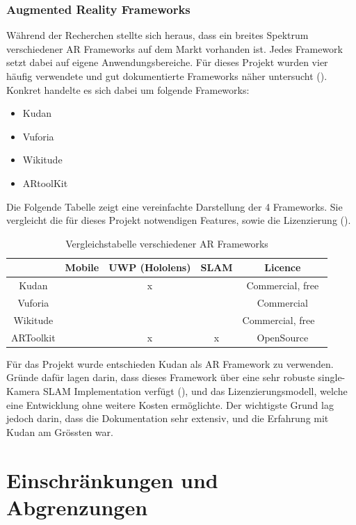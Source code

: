 \documentclass[a4paper]{scrreprt}
\begin{document}
\subsubsection{Augmented Reality Frameworks}
Während der Recherchen stellte sich heraus, dass ein breites Spektrum verschiedener AR Frameworks auf dem Markt vorhanden ist. Jedes Framework setzt dabei auf eigene Anwendungsbereiche. Für dieses Projekt wurden vier häufig verwendete und gut dokumentierte Frameworks näher untersucht (\cite{DDIDevelopment}). Konkret handelte es sich dabei um folgende Frameworks:
\begin{itemize}
\item Kudan
\item Vuforia
\item Wikitude
\item ARtoolKit
\end{itemize}

Die Folgende Tabelle zeigt eine vereinfachte Darstellung der 4 Frameworks. Sie vergleicht die für dieses Projekt notwendigen Features, sowie die Lizenzierung (\cite{DDIDevelopment}).

\begin{table}[h!]
	\center
	\begin{tabular}{|c|c|c|c|c|}
		\hline 
		& \textbf{Mobile} & \textbf{UWP (Hololens)} & \textbf{SLAM} & \textbf{Licence} \\ 
		\hline 
		Kudan & \checkmark & x & \checkmark & Commercial, free \\ 
		\hline 
		Vuforia & \checkmark & \checkmark & \checkmark & Commercial \\ 
		\hline 
		Wikitude & \checkmark & \checkmark & \checkmark & Commercial, free \ \\ 
		\hline 
		ARToolkit & \checkmark & x & x & OpenSource \\ 
		\hline 
	\end{tabular}
	\caption{Vergleichstabelle verschiedener AR Frameworks}
\end{table}


Für das Projekt wurde entschieden Kudan als AR Framework zu verwenden. Gründe dafür lagen darin, dass dieses Framework über eine sehr robuste single-Kamera SLAM Implementation verfügt (\cite{BerfinAyhan2017}), und das Lizenzierungsmodell, welche eine Entwicklung ohne weitere Kosten ermöglichte. Der wichtigste Grund lag jedoch darin, dass die Dokumentation sehr extensiv, und die Erfahrung mit Kudan am Grössten war.

\section{Einschränkungen und Abgrenzungen}
\end{document}
